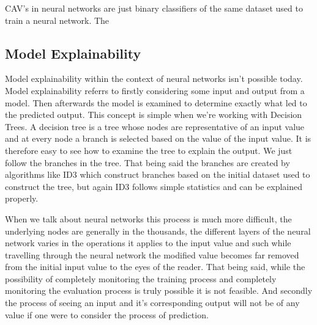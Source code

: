 CAV's in neural networks are just binary classifiers of the same dataset used to train
a neural network. The 

\subsection{Model Explainability}

Model explainability within the context of neural networks isn't possible today. Model
explainability referrs to firstly considering some input and output from a model. Then
afterwards the model is examined to determine exactly what led to the predicted output.
This concept is simple when we're working with Decision Trees. A decision tree is a tree
whose nodes are representative of an input value and at every node a branch is selected
based on the value of the input value. It is therefore easy to see how to examine the tree
to explain the output. We just follow the branches in the tree. That being said the branches
are created by algorithms like ID3 which construct branches based on the initial dataset used
to construct the tree, but again ID3 follows simple statistics and can be explained properly.

When we talk about neural networks this process is much more difficult, the underlying nodes
are generally in the thousands, the different layers of the neural network varies in the operations
it applies to the input value and such while travelling through the neural network the modified
value becomes far removed from the initial input value to the eyes of the reader. That being said,
while the possibility of completely monitoring the training process and completely monitoring the
evaluation process is truly possible it is not feasible. And secondly the process of seeing an
input and it's corresponding output will not be of any value if one were to consider the process
of prediction.

